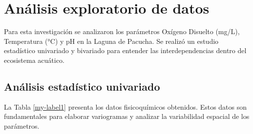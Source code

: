 \section{Análisis exploratorio de datos}

Para esta investigación se analizaron los parámetros Oxígeno Disuelto (mg/L), Temperatura (°C) y pH en la Laguna de Pacucha. Se realizó un estudio estadístico univariado y bivariado para entender las interdependencias dentro del ecosistema acuático.

\subsection{Análisis estadístico univariado}

La Tabla \ref{my-label1} presenta los datos fisicoquímicos obtenidos. Estos datos son fundamentales para elaborar variogramas y analizar la variabilidad espacial de los parámetros.

